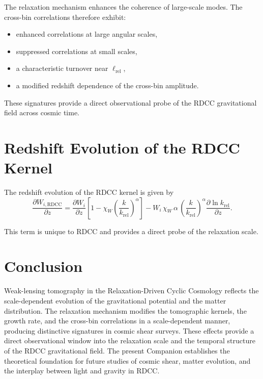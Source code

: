 \documentclass[11pt,a4paper]{article}
\begin{document}
The relaxation mechanism enhances the coherence of large-scale modes. The 
cross-bin correlations therefore exhibit:

\begin{itemize}
    \item enhanced correlations at large angular scales,
    \item suppressed correlations at small scales,
    \item a characteristic turnover near $\ell_{\mathrm{rel}}$,
    \item a modified redshift dependence of the cross-bin amplitude.
\end{itemize}

These signatures provide a direct observational probe of the RDCC gravitational 
field across cosmic time.
\section{Redshift Evolution of the RDCC Kernel}

The redshift evolution of the RDCC kernel is given by
\begin{equation}
    \frac{\partial W_{i,\mathrm{RDCC}}}{\partial z}
    = \frac{\partial W_{i}}{\partial z}
      \left[
        1 - \chi_{W}
        \left(\frac{k}{k_{\mathrm{rel}}}\right)^{\alpha}
      \right]
      - W_{i}\,
        \chi_{W}\,\alpha\,
        \left(\frac{k}{k_{\mathrm{rel}}}\right)^{\alpha}
        \frac{\partial \ln k_{\mathrm{rel}}}{\partial z}.
\end{equation}

This term is unique to RDCC and provides a direct probe of the relaxation scale.
\section{Conclusion}

Weak-lensing tomography in the Relaxation-Driven Cyclic Cosmology reflects the 
scale-dependent evolution of the gravitational potential and the matter 
distribution. The relaxation mechanism modifies the tomographic kernels, the 
growth rate, and the cross-bin correlations in a scale-dependent manner, producing 
distinctive signatures in cosmic shear surveys. These effects provide a direct 
observational window into the relaxation scale and the temporal structure of the 
RDCC gravitational field. The present Companion establishes the theoretical 
foundation for future studies of cosmic shear, matter evolution, and the interplay 
between light and gravity in RDCC.


\nocite{*}

\end{document}
